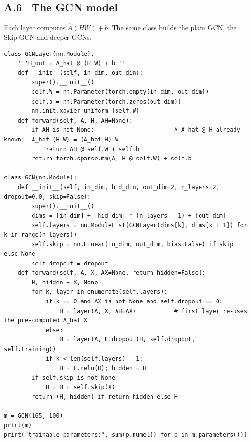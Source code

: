 \subsection*{A.6 \ The GCN model}
Each layer computes $\hat A(HW) + b$. The same class builds the plain GCN, the Skip-GCN and deeper GCNs.
\begin{lstlisting}
class GCNLayer(nn.Module):
    '''H_out = A_hat @ (H W) + b'''
    def __init__(self, in_dim, out_dim):
        super().__init__()
        self.W = nn.Parameter(torch.empty(in_dim, out_dim))
        self.b = nn.Parameter(torch.zeros(out_dim))
        nn.init.xavier_uniform_(self.W)
    def forward(self, A, H, AH=None):
        if AH is not None:                       # A_hat @ H already known:  A_hat (H W) = (A_hat H) W
            return AH @ self.W + self.b
        return torch.sparse.mm(A, H @ self.W) + self.b

class GCN(nn.Module):
    def __init__(self, in_dim, hid_dim, out_dim=2, n_layers=2, dropout=0.0, skip=False):
        super().__init__()
        dims = [in_dim] + [hid_dim] * (n_layers - 1) + [out_dim]
        self.layers = nn.ModuleList(GCNLayer(dims[k], dims[k + 1]) for k in range(n_layers))
        self.skip = nn.Linear(in_dim, out_dim, bias=False) if skip else None
        self.dropout = dropout
    def forward(self, A, X, AX=None, return_hidden=False):
        H, hidden = X, None
        for k, layer in enumerate(self.layers):
            if k == 0 and AX is not None and self.dropout == 0:
                H = layer(A, X, AH=AX)           # first layer re-uses the pre-computed A_hat X
            else:
                H = layer(A, F.dropout(H, self.dropout, self.training))
            if k < len(self.layers) - 1:
                H = F.relu(H); hidden = H
        if self.skip is not None:
            H = H + self.skip(X)
        return (H, hidden) if return_hidden else H

m = GCN(165, 100)
print(m)
print("trainable parameters:", sum(p.numel() for p in m.parameters()))
\end{lstlisting}

